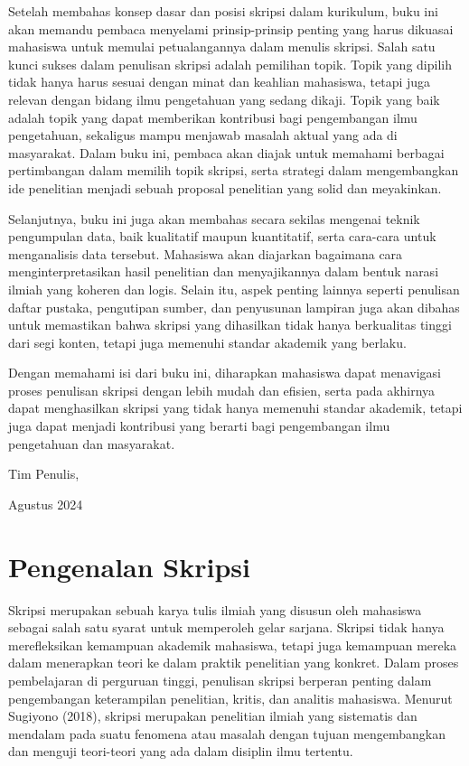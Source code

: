 \documentclass[
  indonesian,
  letterpaper,
]{scrbook}
\begin{document}
Setelah membahas konsep dasar dan posisi skripsi dalam kurikulum, buku
ini akan memandu pembaca menyelami prinsip-prinsip penting yang harus
dikuasai mahasiswa untuk memulai petualangannya dalam menulis skripsi.
Salah satu kunci sukses dalam penulisan skripsi adalah pemilihan topik.
Topik yang dipilih tidak hanya harus sesuai dengan minat dan keahlian
mahasiswa, tetapi juga relevan dengan bidang ilmu pengetahuan yang
sedang dikaji. Topik yang baik adalah topik yang dapat memberikan
kontribusi bagi pengembangan ilmu pengetahuan, sekaligus mampu menjawab
masalah aktual yang ada di masyarakat. Dalam buku ini, pembaca akan
diajak untuk memahami berbagai pertimbangan dalam memilih topik skripsi,
serta strategi dalam mengembangkan ide penelitian menjadi sebuah
proposal penelitian yang solid dan meyakinkan.

Selanjutnya, buku ini juga akan membahas secara sekilas mengenai teknik
pengumpulan data, baik kualitatif maupun kuantitatif, serta cara-cara
untuk menganalisis data tersebut. Mahasiswa akan diajarkan bagaimana
cara menginterpretasikan hasil penelitian dan menyajikannya dalam bentuk
narasi ilmiah yang koheren dan logis. Selain itu, aspek penting lainnya
seperti penulisan daftar pustaka, pengutipan sumber, dan penyusunan
lampiran juga akan dibahas untuk memastikan bahwa skripsi yang
dihasilkan tidak hanya berkualitas tinggi dari segi konten, tetapi juga
memenuhi standar akademik yang berlaku.

Dengan memahami isi dari buku ini, diharapkan mahasiswa dapat menavigasi
proses penulisan skripsi dengan lebih mudah dan efisien, serta pada
akhirnya dapat menghasilkan skripsi yang tidak hanya memenuhi standar
akademik, tetapi juga dapat menjadi kontribusi yang berarti bagi
pengembangan ilmu pengetahuan dan masyarakat. ~

Tim Penulis,

Agustus 2024


\chapter{Pengenalan Skripsi}\label{pengenalan-skripsi}

Skripsi merupakan sebuah karya tulis ilmiah yang disusun oleh mahasiswa
sebagai salah satu syarat untuk memperoleh gelar sarjana. Skripsi tidak
hanya merefleksikan kemampuan akademik mahasiswa, tetapi juga kemampuan
mereka dalam menerapkan teori ke dalam praktik penelitian yang konkret.
Dalam proses pembelajaran di perguruan tinggi, penulisan skripsi
berperan penting dalam pengembangan keterampilan penelitian, kritis, dan
analitis mahasiswa. Menurut Sugiyono (2018), skripsi merupakan
penelitian ilmiah yang sistematis dan mendalam pada suatu fenomena atau
masalah dengan tujuan mengembangkan dan menguji teori-teori yang ada
dalam disiplin ilmu tertentu.
\end{document}
